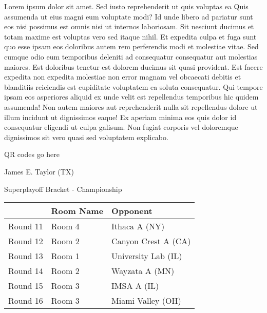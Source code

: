 \documentclass{article}%
\begin{document}
\vspace*{8pt}%
\linebreak%
\newline%
\newline%
    Lorem ipsum dolor sit amet. Sed iusto reprehenderit ut quis voluptas ea Quis assumenda ut eius magni eum voluptate modi? Id unde libero ad pariatur sunt eos nisi possimus est omnis nisi ut internos laboriosam. Sit nesciunt ducimus et totam maxime est voluptas vero sed itaque nihil. Et expedita culpa et fuga sunt quo esse ipsam eos doloribus autem rem perferendis modi et molestiae vitae.\newline%
\newline%
    Sed cumque odio eum temporibus deleniti ad consequatur consequatur aut molestias maiores. Est doloribus tenetur est dolorem ducimus sit quasi provident. Est facere expedita non expedita molestiae non error magnam vel obcaecati debitis et blanditiis reiciendis est cupiditate voluptatem ea soluta consequatur. Qui tempore ipsam eos asperiores aliquid ex unde velit est repellendus temporibus hic quidem assumenda!\newline%
\newline%
    Non autem maiores aut reprehenderit nulla sit repellendus dolore ut illum incidunt ut dignissimos eaque! Ex aperiam minima eos quis dolor id consequatur eligendi ut culpa galisum. Non fugiat corporis vel doloremque dignissimos sit vero quasi sed voluptatem explicabo.\newline%
\newline%
\vspace*{30pt}%
\begin{center}%
\begin{Huge}%
QR codes go here%
\end{Huge}%
\end{center}%
\newpage%
\begin{center}%
\begin{Huge}%
James E. Taylor (TX)%
\end{Huge}%
\vspace*{8pt}%
\linebreak%
\begin{Large}%
Superplayoff Bracket {-} Championship%
\end{Large}%
\end{center}%
%
\begin{tabularx}{\textwidth}{|c|Y|Y|}%
\hline%
&Room Name&Opponent\\%
\hline%
Round 11&Room 4&Ithaca A (NY)\\%
Round 12&Room 2&Canyon Crest A (CA)\\%
Round 13&Room 1&University Lab (IL)\\%
Round 14&Room 2&Wayzata A (MN)\\%
Round 15&Room 3&IMSA A (IL)\\%
Round 16&Room 3&Miami Valley (OH)\\%
\hline%
\end{tabularx}%
\end{document}
